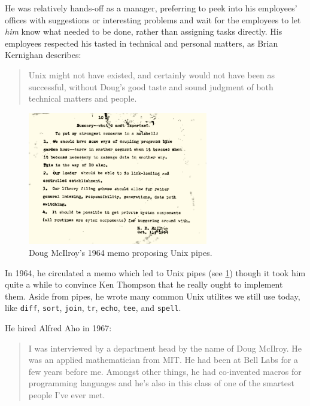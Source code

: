He was relatively hands-off as a manager, preferring to peek into his employees' offices
with suggestions or interesting problems and wait for the employees to let \textit{him} know
what needed to be done, rather than assigning tasks directly.
His employees respected his tasted in technical and personal matters,
as Brian Kernighan describes\cite{kernighan_unix:_2020}:

\begin{quotation}
Unix might not have existed, and certainly
would not have been as successful, without Doug's good taste and sound
judgment of both technical matters and people.
\end{quotation}

\begin{figure}
    \centering
    \includegraphics[width=0.7\textwidth]{resource/software/unix/doug-1964-pipes.png}
    \caption{Doug McIlroy's 1964 memo proposing Unix pipes\cite{doug_mcilroy_origin_of_unix_pipes_1964}.}
    \label{fig:unix-pipes-mcilroy-memo}
\end{figure}

In 1964, he circulated a memo which led to Unix pipes\cite{doug_mcilroy_origin_of_unix_pipes_1964}
(see \ref{fig:unix-pipes-mcilroy-memo}) though it took him quite a while to convince
Ken Thompson that he really ought to implement them.
Aside from pipes, he wrote many common Unix utilites we still use today, like
\texttt{diff}, \texttt{sort}, \texttt{join}, \texttt{tr}, \texttt{echo}, \texttt{tee}, and \texttt{spell}.

He hired Alfred Aho in 1967\cite{aho_oral_history_2022}:

\begin{quotation}
I was interviewed by a department head by the name of Doug McIlroy. He was an applied
mathematician from MIT. He had been at Bell Labs for a few years before me. Amongst other things, he
had co-invented macros for programming languages and he's also in this class of one of the smartest
people I've ever met.
\end{quotation}


